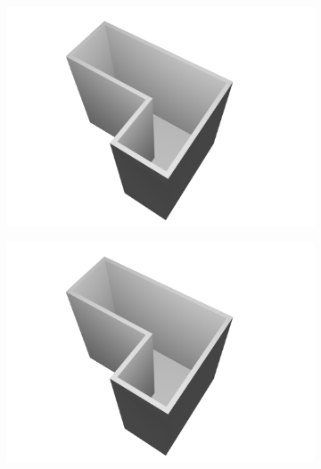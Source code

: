 \documentclass[binding=0.6cm,noexaminfo]{sapthesis}
\begin{document}
\begin{figure}[h!]
\begin{subfigure}{.49\textwidth}
	\centering
	\includegraphics[width=.90\linewidth]{results/pred_2}
	\caption{}
\end{subfigure}
\begin{subfigure}{.49\textwidth}
	\centering
	\includegraphics[width=.90\linewidth]{results/true_2}
	\caption{}
\end{subfigure}


\end{figure}
\end{document}
